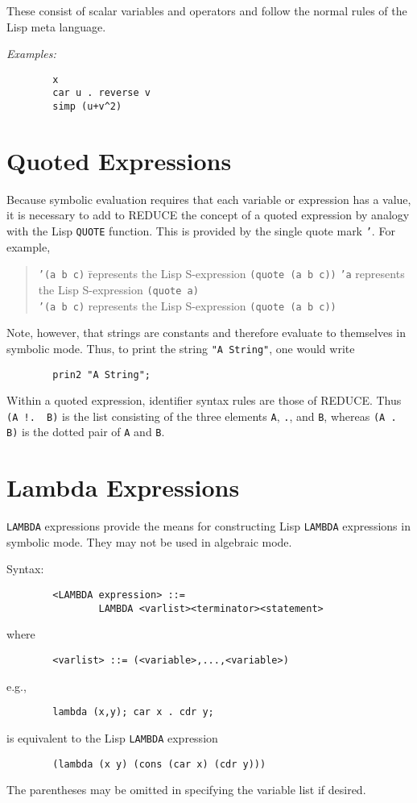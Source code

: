 \documentclass[11pt,letterpaper]{book}
\makeatletter
\newcommand{\REDUCE}{REDUCE}
\newcommand{\underscore}{\_}
\newcommand{\ttindex}[1]{{\renewcommand{\_}{\protect\underscore}%
                          \index{#1@{\tt #1}}}}
\makeatother
\begin{document}
These consist of scalar variables and operators and follow the normal
rules of the Lisp meta language.

{\it Examples:}
{\small\begin{verbatim}
        x
        car u . reverse v
        simp (u+v^2)
\end{verbatim}}

\section{Quoted Expressions}\ttindex{QUOTE}

Because symbolic evaluation requires that each variable or expression has a
value, it is necessary to add to {\REDUCE} the concept of a quoted expression
by analogy with the Lisp {\tt QUOTE} function. This is provided by the single
quote mark {\tt '}.  For example,
\begin{quote}
\begin{tabbing}
{\tt '(a b c)} \= represents the Lisp S-expression \= {\tt (quote (a b
c))}\kill
{\tt 'a} \> represents the Lisp S-expression \>
{\tt (quote a)} \\
{\tt '(a b c)} \> represents the Lisp S-expression \> {\tt (quote (a b c))}
\end{tabbing}
\end{quote}
Note, however, that strings are constants and therefore evaluate to
themselves in symbolic mode. Thus, to print the string {\tt "A String"}, one
would write
{\small\begin{verbatim}
        prin2 "A String";
\end{verbatim}}
Within a quoted expression, identifier syntax rules are those of {\REDUCE}.
Thus {\tt  (A~!.~~B)} is the list consisting of the three elements {\tt A},
{\tt .}, and {\tt B}, whereas {\tt (A .  B)} is the dotted pair of {\tt A}
and {\tt B}.

\section{Lambda Expressions}\ttindex{LAMBDA}
\label{sec-lambda}

{\tt LAMBDA} expressions provide the means for constructing Lisp {\tt LAMBDA}
expressions in symbolic mode. They may not be used in algebraic mode.

Syntax:
{\small\begin{verbatim}
        <LAMBDA expression> ::=
                LAMBDA <varlist><terminator><statement>
\end{verbatim}}
 where
{\small\begin{verbatim}
        <varlist> ::= (<variable>,...,<variable>)
\end{verbatim}}
e.g.,
{\small\begin{verbatim}
        lambda (x,y); car x . cdr y;
\end{verbatim}}
is equivalent to the Lisp {\tt LAMBDA} expression
{\small\begin{verbatim}
        (lambda (x y) (cons (car x) (cdr y)))
\end{verbatim}}
The parentheses may be omitted in specifying the variable list if desired.
\end{document}
